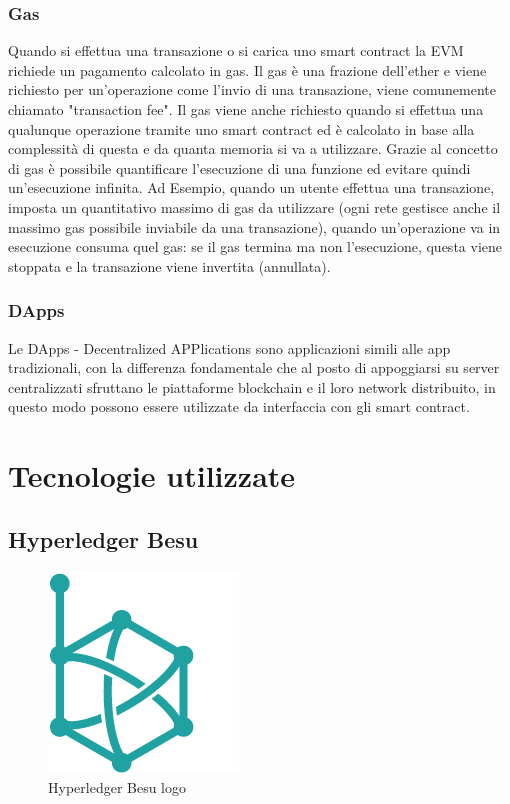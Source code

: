 \documentclass[11pt,a4paper,titlepage,twoside,openright]{report}
\begin{document}
\subsection{Gas}
Quando si effettua una transazione o si carica uno smart contract la EVM richiede un pagamento calcolato in gas. Il gas è una frazione dell'ether e viene richiesto per un'operazione come l'invio di una transazione, viene comunemente chiamato "transaction fee". Il gas viene anche richiesto quando si effettua una qualunque operazione tramite uno smart contract ed è calcolato in base alla complessità di questa e da quanta memoria si va a utilizzare. Grazie al concetto di gas è possibile quantificare l'esecuzione di una funzione ed evitare quindi un'esecuzione infinita. Ad Esempio, quando un utente effettua una transazione, imposta un quantitativo massimo di gas da utilizzare (ogni rete gestisce anche il massimo gas possibile inviabile da una transazione), quando un'operazione va in esecuzione consuma quel gas: se il gas termina ma non l'esecuzione, questa viene stoppata e la transazione viene invertita (annullata).

\subsection{DApps}

Le DApps - Decentralized APPlications sono applicazioni simili alle app tradizionali, con la differenza fondamentale che al posto di appoggiarsi su server centralizzati sfruttano le piattaforme blockchain e il loro network distribuito, in questo modo possono essere utilizzate da interfaccia con gli smart contract.

\chapter{Tecnologie utilizzate}

\section{Hyperledger Besu}
\begin{figure}
	\includegraphics[height=0.2\textheight]{Hyperledger_Besu}
	\centering
	\caption{Hyperledger Besu logo}
	\label{fig:Hyperledger_Besu_logo}
\end{figure}
\end{document}
